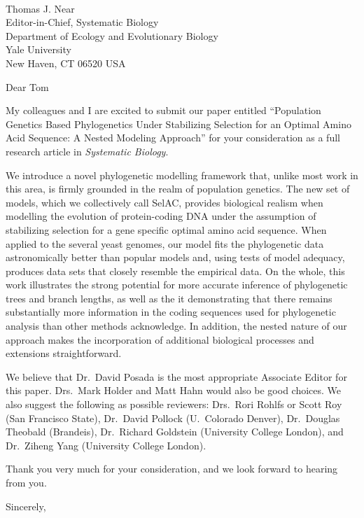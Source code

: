 \documentclass[11pt,letterpaper]{letter}
\begin{document}
\begin{letter}{
\ \\
Thomas J. Near\\
Editor-in-Chief, Systematic Biology\\
Department of Ecology and Evolutionary Biology\\
Yale University\\
New Haven, CT 06520 USA
}


\opening{Dear Tom}

My colleagues and I are excited to submit our paper entitled “Population Genetics Based Phylogenetics Under Stabilizing Selection for an Optimal Amino Acid Sequence: A Nested Modeling Approach” for your consideration as a full research article in \emph{Systematic Biology}.

We introduce a novel phylogenetic modelling framework that, unlike most work in this area, is firmly grounded in the realm of population genetics. 
The new set of models, which we collectively call SelAC, provides biological realism when modelling the evolution of protein-coding DNA under the assumption of stabilizing selection for a gene specific optimal amino acid sequence. 
When applied to the several yeast genomes, our model fits the phylogenetic data astronomically better than popular models and, using tests of model adequacy,  produces data sets that closely resemble the empirical data. 
On the whole, this work illustrates the strong potential for more accurate inference of phylogenetic trees and branch lengths, as well as the it demonstrating that there remains substantially more information in the coding sequences used for phylogenetic analysis than other methods acknowledge.
In addition, the nested nature of our approach makes the incorporation of additional biological processes and extensions straightforward. 

We believe that Dr.~David Posada is the most appropriate Associate Editor for this paper. Drs.~Mark Holder and Matt Hahn would also be good choices. 
We also suggest the following as possible reviewers: Drs.~Rori Rohlfs or Scott Roy (San Francisco State), Dr.~David Pollock (U.~Colorado Denver), Dr.~Douglas Theobald (Brandeis), Dr.~Richard Goldstein (University College London), and Dr.~Ziheng Yang (University College London).

Thank you very much for your consideration, and we look forward to hearing from you.


\closing{Sincerely,}
\end{letter}
\end{document}
